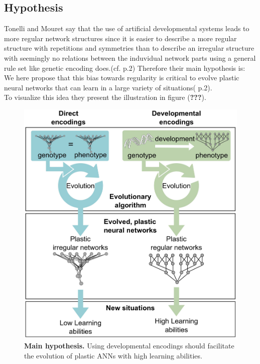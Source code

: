 \documentclass[12pt,twoside]{article}
\theoremstyle{plain}
\theoremstyle{definition}
\theoremstyle{remark}
\begin{document}
\subsection{Hypothesis}
Tonelli and Mouret say that the use of artificial developmental systems leads to more regular network structures since it is easier to describe a more regular structure with repetitions and symmetries than to describe an irregular structure with seemingly no relations between the induvidual network parts using a general rule set like genetic encoding does.(cf. \cite{citeulike:12788284} p.2)
Therefore their main hypothesis is:
\glqq We here propose that this bias towards regularity is critical to evolve plastic neural networks that can learn in a large variety of situations\grqq{}(\cite{citeulike:12788284} p.2).\\
To visualize this idea they present the illustration in figure (\textbf{???}).

\begin{figure}
	\begin{center}
		\includegraphics[totalheight=0.4\textheight]{direct_vs_developemental.png}
		\caption[\textbf{Main hypothesis.} Using developmental encodings should facilitate the evolution of plastic ANNs with high learning abilities.
		]{\textbf{Main hypothesis.} Using developmental encodings should facilitate the evolution of plastic ANNs with high learning abilities.
			 \footnotemark} %
	\end{center}
\end{figure}
\end{document}
